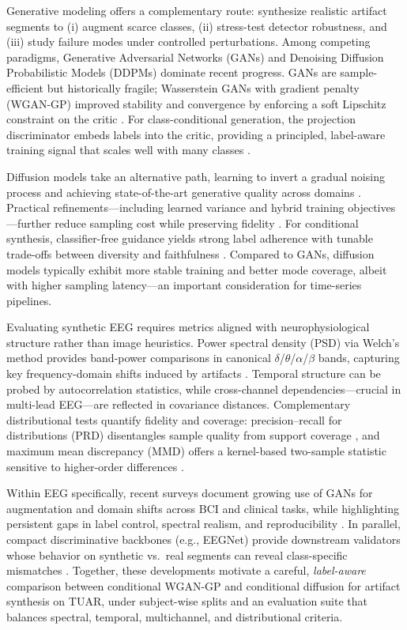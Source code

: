 \documentclass{article}
\begin{document}
Generative modeling offers a complementary route: synthesize realistic artifact segments to (i) augment scarce classes, (ii) stress-test detector robustness, and (iii) study failure modes under controlled perturbations. Among competing paradigms, Generative Adversarial Networks (GANs) and Denoising Diffusion Probabilistic Models (DDPMs) dominate recent progress. GANs are sample-efficient but historically fragile; Wasserstein GANs with gradient penalty (WGAN-GP) improved stability and convergence by enforcing a soft Lipschitz constraint on the critic \citep{gulrajani2017wgan}. For class-conditional generation, the projection discriminator embeds labels into the critic, providing a principled, label-aware training signal that scales well with many classes \citep{miyato2018cgan}. 

Diffusion models take an alternative path, learning to invert a gradual noising process and achieving state-of-the-art generative quality across domains \citep{ho2020denoisingprobabilistic}. Practical refinements—including learned variance and hybrid training objectives—further reduce sampling cost while preserving fidelity \citep{nichol2021improveddenoising}. For conditional synthesis, classifier-free guidance yields strong label adherence with tunable trade-offs between diversity and faithfulness \citep{ho2022classifierfree}. Compared to GANs, diffusion models typically exhibit more stable training and better mode coverage, albeit with higher sampling latency—an important consideration for time-series pipelines.

Evaluating synthetic EEG requires metrics aligned with neurophysiological structure rather than image heuristics. Power spectral density (PSD) via Welch’s method provides band-power comparisons in canonical $\delta$/$\theta$/$\alpha$/$\beta$ bands, capturing key frequency-domain shifts induced by artifacts \citep{welch1967usefast}. Temporal structure can be probed by autocorrelation statistics, while cross-channel dependencies—crucial in multi-lead EEG—are reflected in covariance distances. Complementary distributional tests quantify fidelity and coverage: precision–recall for distributions (PRD) disentangles sample quality from support coverage \citep{sajjadi2018assessingprecision}, and maximum mean discrepancy (MMD) offers a kernel-based two-sample statistic sensitive to higher-order differences \citep{binkowski2018demystifyingmmd}. 

Within EEG specifically, recent surveys document growing use of GANs for augmentation and domain shifts across BCI and clinical tasks, while highlighting persistent gaps in label control, spectral realism, and reproducibility \citep{habashi2023adversarialnetworks}. In parallel, compact discriminative backbones (e.g., EEGNet) provide downstream validators whose behavior on synthetic vs.\ real segments can reveal class-specific mismatches \citep{lawhern2018eegnetcompact}. Together, these developments motivate a careful, \emph{label-aware} comparison between conditional WGAN-GP and conditional diffusion for artifact synthesis on TUAR, under subject-wise splits and an evaluation suite that balances spectral, temporal, multichannel, and distributional criteria.
\end{document}
